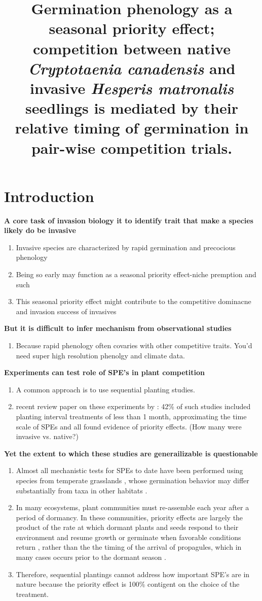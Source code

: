 \documentclass{article}\usepackage[]{graphicx}\usepackage[]{color}
\title{Germination phenology as a seasonal priority effect; competition between native \textit {Cryptotaenia canadensis} and invasive \textit{Hesperis matronalis} seedlings is mediated by their relative timing of germination in pair-wise competition trials.}
\begin{document}
\maketitle
\section{Introduction}
\textbf{A core task of invasion biology it to identify trait that make a species likely do be invasive}
\begin{enumerate}
\item Invasive species are characterized by rapid germination and precocious phenology
\item Being so early may function as a seasonal priority effect-niche premption and such
\item This seasonal priority effect might contribute to the competitive dominacne and invasion success of invasives
\end{enumerate}

\textbf{But it is difficult to infer mechanism from observational studies}
\begin{enumerate}
\item Because rapid phenology often covaries with other competitive traits. You'd need super high resolution phenolgy and climate data.
\end{enumerate}

\textbf{Experiments can test role of SPE's in plant competition}
\begin{enumerate}
\item  A common approach is to use sequential planting studies.
\item recent review paper on these experiments by \citet{Weidlich:2020aa}: 42\% of such studies included planting interval treatments of less than 1 month, approximating the time scale of SPEs and all found evidence of priority effects. (How many were invasive vs. native?)
\end{enumerate}

\textbf{Yet the extent to which these studies are generailizable is questionable}
\begin{enumerate}
\item  Almost all mechanistic tests for SPEs to date have been performed using species from temperate grasslands \citep{Weidlich:2020aa}, whose germination behavior may differ substantially from taxa in other habitats \citep{Tudela-Isanta:2018aa}.
\item In many ecosystems, plant communities must re-assemble each year after a period of dormancy. In these communities, priority effects are largely the product of the rate at which dormant plants and seeds respond to their environment and resume growth or germinate when favorable conditions return \citep{Rudolf:2019aa}, rather than the the timing of the arrival of propagules, which in many cases occurs prior to the dormant season \citep{Howe:1982aa,Baskin:1988aa}.
\item Therefore, sequential plantings cannot address how important SPE's are in nature because the priority effect is 100\% contigent on the choice of the treatment.
\end{enumerate}
\end{document}
